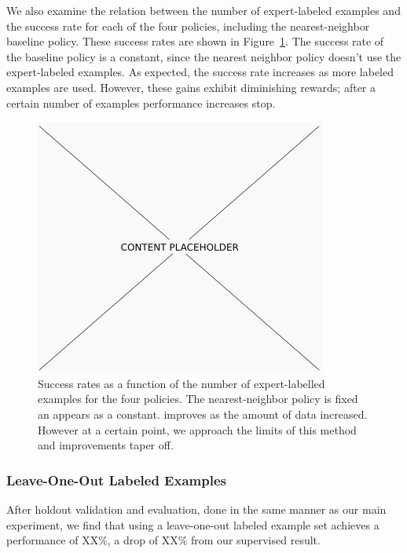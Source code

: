 We also examine the relation between the number of expert-labeled examples and the success rate for each of the four policies, including the nearest-neighbor baseline policy.
These success rates are shown in Figure~\ref{fig:number_examples}.
The success rate of the baseline policy is a constant, since the nearest neighbor policy doesn't use the expert-labeled examples.
As expected, the success rate increases as more labeled examples are used. However, these gains exhibit diminishing rewards; after
a certain number of examples performance increases stop.

\begin{figure}[h!]
  \centering
    \includegraphics[width=0.9\linewidth]{figures/placeholder.png}
  \caption{Success rates as a function of the number of expert-labelled examples for the four policies. The nearest-neighbor policy is fixed
           an appears as a constant. \mmql{} improves as the amount of data increased. However at a certain point, we approach the limits of this
           method and improvements taper off.}
  \label{fig:number_examples}
\end{figure}

\subsubsection{Leave-One-Out Labeled Examples}

After holdout validation and evaluation, done in the same manner as our main
experiment, we find that using a leave-one-out labeled example set achieves a
performance of XX\%, a drop of XX\% from our supervised result.
